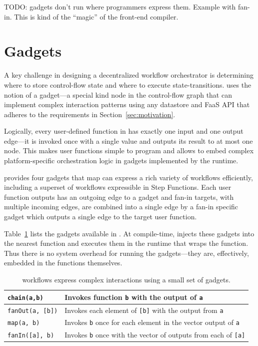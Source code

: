 TODO: gadgets don't run where programmers express them. Example with fan-in.
This is kind of the ``magic'' of the front-end compiler.

\section{Gadgets}\label{sec:gadgets}

A key challenge in designing a decentralized workflow orchestrator is
determining where to store control-flow state and where to execute
state-transitions. \name{} uses the notion of a gadget---a special kind node in
the control-flow graph that can implement complex interaction patterns using any
datastore and FaaS API that adheres to the requirements in
Section~\ref{sec:motivation}.

Logically, every user-defined function in \name{} has exactly one input and one
output edge---it is invoked once with a single value and outputs its result to
at most one node. This makes user functions simple to program and allows \name{}
to embed complex platform-specific orchestration logic in gadgets implemented by
the runtime.

\name{} provides four gadgets that map can express a rich variety of workflows
efficiently, including a superset of workflows expressible in Step Functions.
Each user function outputs has an outgoing edge to a gadget and fan-in targets,
with multiple incoming edges, are combined into a single edge by a fan-in
specific gadget which outputs a single edge to the target user function.

Table~\ref{tab:gadgets} lists the gadgets available in \name{}.  At
compile-time, \name{} injects these gadgets into the nearest function and
executes them in the \name{} runtime that wraps the function. Thus there is no
system overhead for running the gadgets---they are, effectively, embedded in
the functions themselves.

\begin{table}[t!]
  \centering
  \begin{tabular}{ |m{8em}| m{13em} | }
    \hline
      \texttt{chain(a,b) }& Invokes function \texttt{b} with the output of \texttt{a} \\
    \hline
      \texttt{fanOut(a, [b])} & Invokes each element of \texttt{[b]} with the output from \texttt{a} \\
    \hline
      \texttt{map(a, b)} & Invokes \texttt{b} once for each element in the vector output of \texttt{a} \\
    \hline
      \texttt{fanIn([a], b)} & Invokes \texttt{b} once with the vector of outputs from each of \texttt{[a]} \\
    \hline
\end{tabular}
  \caption{\name{} workflows express complex interactions using a small set of gadgets.} 
  \label{tab:gadgets}
\end{table}

